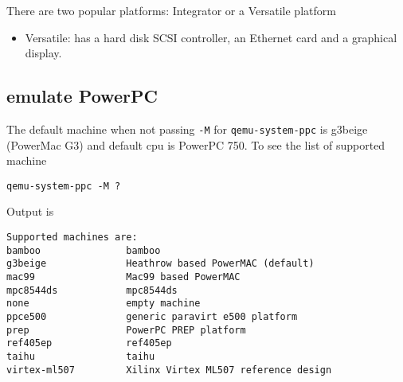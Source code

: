 There are two popular platforms: Integrator or a Versatile platform
\begin{itemize}
  \item Versatile: has a hard disk SCSI controller, an Ethernet card and a
  graphical display.
  
\end{itemize}


\subsection{emulate PowerPC}
\label{sec:QEMU-emulate-PowerPC}

The default machine when not passing \verb!-M! for \verb!qemu-system-ppc! is
g3beige (PowerMac G3) and default cpu is PowerPC 750. To see the list of
supported machine
\begin{verbatim}
qemu-system-ppc -M ?
\end{verbatim}
Output is
\begin{verbatim}
Supported machines are:
bamboo               bamboo
g3beige              Heathrow based PowerMAC (default)
mac99                Mac99 based PowerMAC
mpc8544ds            mpc8544ds
none                 empty machine
ppce500              generic paravirt e500 platform
prep                 PowerPC PREP platform
ref405ep             ref405ep
taihu                taihu
virtex-ml507         Xilinx Virtex ML507 reference design
\end{verbatim}


